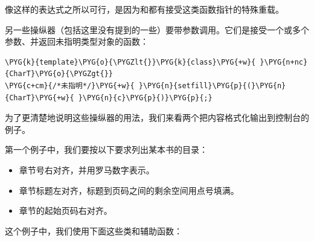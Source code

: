 
像这样的表达式之所以可行，是因为和都有接受这类函数指针的特殊重载。



另一些操纵器（包括这里没有提到的一些）要带参数调用。它们是接受一个或多个参数、并返回未指明类型对象的函数：



\begin{codeblockbg}
\begin{Verbatim}[commandchars=\\\{\},breaklines=true,breakanywhere=true,fontsize=\codefont,xleftmargin=17bp]
\PYG{k}{template}\PYG{o}{\PYGZlt{}}\PYG{k}{class}\PYG{+w}{ }\PYG{n+nc}{CharT}\PYG{o}{\PYGZgt{}}
\PYG{c+cm}{/*未指明*/}\PYG{+w}{ }\PYG{n}{setfill}\PYG{p}{(}\PYG{n}{CharT}\PYG{+w}{ }\PYG{n}{c}\PYG{p}{)}\PYG{p}{;}
\end{Verbatim}
\end{codeblockbg}



为了更清楚地说明这些操纵器的用法，我们来看两个把内容格式化输出到控制台的例子。



第一个例子中，我们要按以下要求列出某本书的目录：



\begin{itemize}
\item 章节号右对齐，并用罗马数字表示。



\item 章节标题左对齐，标题到页码之间的剩余空间用点号填满。



\item 章节的起始页码右对齐。

\end{itemize}



这个例子中，我们使用下面这些类和辅助函数：



